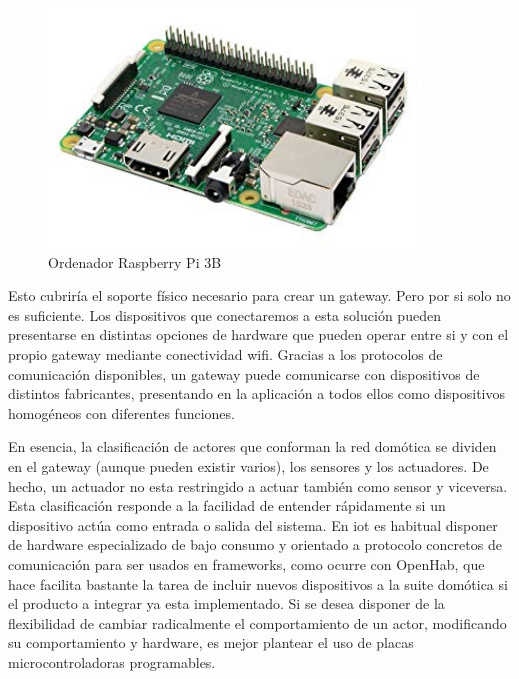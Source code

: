 \begin{figure}[hbt!]
\centering
\includegraphics[height=2.5in]{figures/raspberrypi3b.jpg}
\caption[captura de una Raspberry]{Ordenador Raspberry Pi 3B\footnotemark}
\end{figure}

\vspace{1.5cm}


Esto cubriría el soporte físico necesario para crear un gateway. Pero por si solo no es suficiente. Los dispositivos que conectaremos a esta solución pueden presentarse en distintas opciones de hardware que pueden operar entre si y con el propio gateway mediante conectividad \gls{wifi}. Gracias a los protocolos de comunicación disponibles, un gateway puede comunicarse con dispositivos de distintos fabricantes, presentando en la aplicación a todos ellos como dispositivos homogéneos con diferentes funciones.

\vspace{1.5cm}

En esencia, la clasificación de actores que conforman la red domótica se dividen en el gateway (aunque pueden existir varios), los sensores y los actuadores. De hecho, un actuador no esta restringido a actuar también como sensor y viceversa. Esta clasificación responde a la facilidad de entender rápidamente si un dispositivo actúa como entrada o salida del sistema. En \gls{iot} es habitual disponer de hardware especializado de bajo consumo y orientado a protocolo concretos de comunicación para ser usados en frameworks, como ocurre con OpenHab, que hace facilita bastante la tarea de incluir nuevos dispositivos a la suite domótica si el producto a  integrar ya esta implementado. Si se desea disponer de la flexibilidad de cambiar radicalmente el comportamiento  de un actor, modificando su comportamiento y hardware, es mejor plantear el uso de placas microcontroladoras programables.

